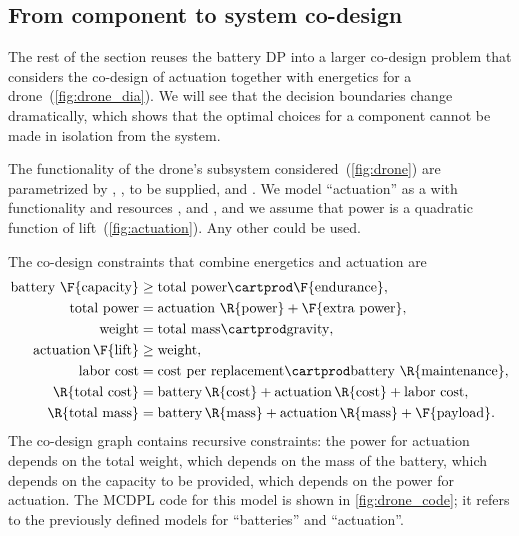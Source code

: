 \subsection{From component to system co-design}

The rest of the section reuses the battery DP into a larger co-design problem that considers the co-design of actuation together with energetics for a drone~(\cref{fig:drone_dia}).
We will see that the decision boundaries change dramatically, which shows that the optimal choices for a component cannot be made in isolation from the system.

The functionality of the drone's subsystem considered~(\cref{fig:drone}) are parametrized by , ,  to be supplied, and .
We model ``actuation''
as a  with functionality  and resources ,  and , and we assume that power is a quadratic function of lift~(\cref{fig:actuation}).
Any other  could be used.


The co-design constraints that combine energetics and actuation are
    {\small{}
        \begin{align}
            \text{battery }\F{\text{capacity}} & \geq\text{total power}\cartprod\F{\text{endurance}},\label{eq:drone_eq_first} \\
            \text{total power}                 & =\text{actuation }\R{\text{power}}+\F{\text{extra power}},\nonumber \\
            \text{weight}                      & =\text{total mass}\cartprod\text{gravity},\nonumber \\
            \text{actuation}\,\F{\text{lift}}  & \geq\text{weight},\nonumber \\
            \text{labor cost}                  & =\text{cost per replacement}\cartprod\text{battery }\R{\text{maintenance}},\nonumber \\
            \R{\text{total cost}}              & =\text{battery}\,\R{\text{cost}}+\text{actuation}\,\R{\text{cost}}+\text{labor cost},\nonumber \\
            \R{\text{total mass}}              & =\text{battery}\,\R{\text{mass}}+\text{actuation}\,\R{\text{mass}}+\F{\text{payload}}.
            \label{eq:drone_eq_last}
        \end{align}
    }
The co-design graph contains recursive constraints: the power for
actuation depends on the total weight, which depends on the mass of
the battery, which depends on the capacity to be provided, which depends
on the power for actuation.
The MCDPL code for this model is shown
in \cref{fig:drone_code}; it refers to the previously defined models
for ``batteries'' and ``actuation''.


